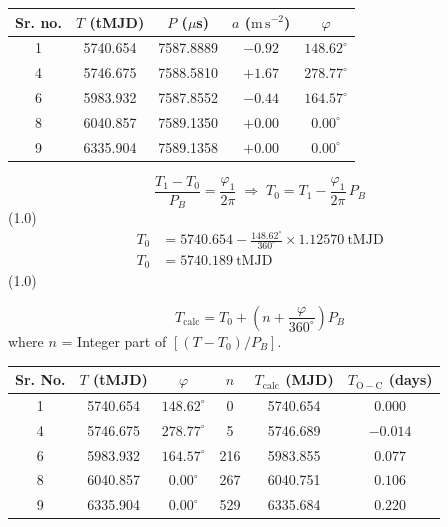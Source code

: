 \begin{description}
  \begin{center}
  \begin{tabular}{ccccc}
    \hline
    Sr. no. & $T$ (tMJD) & $P$ ($\mu$s) & $a$ ($\mathrm{m\,s^{-2}}$)
      & $\varphi$ \\
    \hline
    1 & 5740.654 & 7587.8889 & $-0.92$ & $148.62^\circ$ \\
    4 & 5746.675 & 7588.5810 & $+1.67$ & $278.77^\circ$ \\
    6 & 5983.932 & 7587.8552 & $-0.44$ & $164.57^\circ$ \\
    8 & 6040.857 & 7589.1350 & $+0.00$ & $0.00^\circ$ \\
    9 & 6335.904 & 7589.1358 & $+0.00$ & $0.00^\circ$ \\
    \hline
  \end{tabular}
  \end{center}

\item[(D1.7a)]
  \[ \frac{T_1 - T_0}{P_B} = \frac{\varphi_1}{2\pi}
     \;\Rightarrow\; T_0 = T_1 - \frac{\varphi_1}{2\pi}\,P_B \]
  \hfill(1.0)
  \begin{align*}
    T_0 &= 5740.654 - \frac{148.62^\circ}{360^\circ}
      \times 1.12570\ \mathrm{tMJD} \\
    T_0 &= 5740.189\ \mathrm{tMJD}
  \end{align*}
  \hfill(1.0)

\item[(D1.7b)]
  \[ T_{\mathrm{calc}} = T_0
     + \left( n + \frac{\varphi}{360^\circ} \right) P_B \]
  where $n$ = Integer part of $[(T - T_0)/P_B]$.

  \begin{center}
  \begin{tabular}{cccccc}
    \hline
    Sr. No. & $T$ (tMJD) & $\varphi$ & $n$ & $T_{\mathrm{calc}}$ (MJD)
      & $T_{\mathrm{O-C}}$ (days) \\
    \hline
    1 & 5740.654 & $148.62^\circ$ & 0   & 5740.654 & $0.000$ \\
    4 & 5746.675 & $278.77^\circ$ & 5   & 5746.689 & $-0.014$ \\
    6 & 5983.932 & $164.57^\circ$ & 216 & 5983.855 & $0.077$ \\
    8 & 6040.857 & $0.00^\circ$   & 267 & 6040.751 & $0.106$ \\
    9 & 6335.904 & $0.00^\circ$   & 529 & 6335.684 & $0.220$ \\
    \hline
  \end{tabular}
  \end{center}


\end{description}
